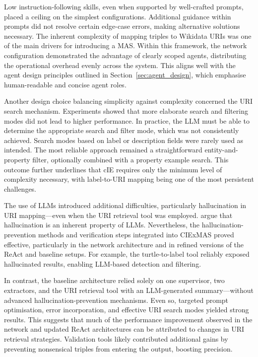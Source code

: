 \documentclass[a4paper,oneside,bibliography=totoc]{scrbook}
\begin{document}
Low instruction-following skills, even when supported by well-crafted prompts, placed a ceiling on the simplest configurations. Additional guidance within prompts did not resolve certain edge-case errors, making alternative solutions necessary. The inherent complexity of mapping triples to Wikidata URIs was one of the main drivers for introducing a \ac{MAS}. Within this framework, the network configuration demonstrated the advantage of clearly scoped agents, distributing the operational overhead evenly across the system. This aligns well with the agent design principles outlined in Section~\ref{sec:agent_design}, which emphasise human-readable and concise agent roles.

Another design choice balancing simplicity against complexity concerned the URI search mechanism. Experiments showed that more elaborate search and filtering modes did not lead to higher performance. In practice, the \ac{LLM} must be able to determine the appropriate search and filter mode, which was not consistently achieved. Search modes based on label or description fields were rarely used as intended. The most reliable approach remained a straightforward entity-and-property filter, optionally combined with a property example search. This outcome further underlines that \ac{cIE} requires only the minimum level of complexity necessary, with label-to-URI mapping being one of the most persistent challenges.

The use of \acp{LLM} introduced additional difficulties, particularly hallucination in URI mapping—even when the URI retrieval tool was employed. \citet{Xu2025} argue that hallucination is an inherent property of \acp{LLM}. Nevertheless, the hallucination-prevention methods and verification steps integrated into CIExMAS proved effective, particularly in the network architecture and in refined versions of the ReAct and baseline setups. For example, the turtle-to-label tool reliably exposed hallucinated results, enabling \ac{LLM}-based detection and filtering.

In contrast, the baseline architecture relied solely on one supervisor, two extractors, and the URI retrieval tool with an \ac{LLM}-generated summary—without advanced hallucination-prevention mechanisms. Even so, targeted prompt optimisation, error incorporation, and effective URI search modes yielded strong results. This suggests that much of the performance improvement observed in the network and updated ReAct architectures can be attributed to changes in URI retrieval strategies. Validation tools likely contributed additional gains by preventing nonsensical triples from entering the output, boosting precision.
\end{document}
